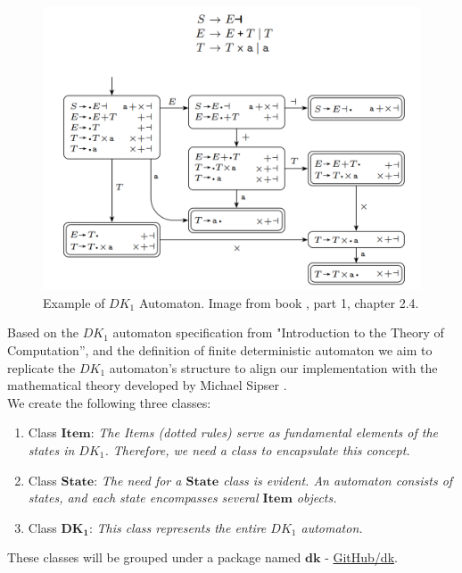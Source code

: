 \begin{figure}[h!]
    \includegraphics[width=\linewidth]{DK1 example.png}
    \caption{Example of \(DK_{1}\) Automaton. Image from book \cite{sipser}, part 1, chapter 2.4.}
    \label{3}
\end{figure}

Based on the \( DK_{1} \) automaton specification from "Introduction to the Theory of Computation”, and the definition of finite deterministic automaton we aim to replicate the \( DK_{1} \) automaton's structure to align our implementation with the mathematical theory developed by Michael Sipser \cite{sipser}.\\

We create the following three classes:
\begin{enumerate}
    \item Class \(\boldsymbol{Item}\): \textit{The Items (dotted rules) serve as fundamental elements of the states in \( DK_{1} \). Therefore, we need a class to encapsulate this concept.}
    \item Class \(\boldsymbol{State}\): \textit{The need for a \(\boldsymbol{State}\) class is evident. An automaton consists of states, and each state encompasses several \(\boldsymbol{Item}\) objects.}
    \item Class \(\boldsymbol{DK_{1}}\): \textit{This class represents the entire \( DK_{1} \) automaton.}
\end{enumerate}

These classes will be grouped under a package named \(\boldsymbol{dk}\) - \href{https://github.com/fyfsb/dcfg/tree/main/src/main/java/dk}{GitHub/dk}.\\


